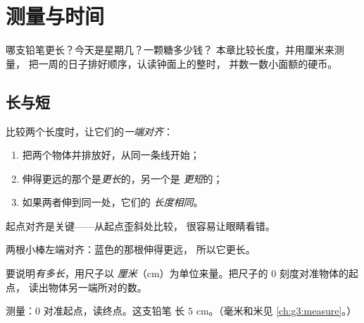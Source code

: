 \chapter{测量与时间}\label{ch:g1:measure}

哪支铅笔更长？今天是星期几？一颗糖多少钱？
本章比较长度，并用厘米来测量，
把一周的日子排好顺序，认读钟面上的整时，
并数一数小面额的硬币。

\section{长与短}

\begin{method}[比较长度]\label{met:g1:measure:compare}
比较两个长度时，让它们的\emph{一端对齐}：
\begin{enumerate}
  \item 把两个物体并排放好，从同一条线开始；
  \item 伸得更远的那个是\emph{更长}的，另一个是
        \emph{更短}的；
  \item 如果两者伸到同一处，它们的\emph{
        长度相同}。
\end{enumerate}
起点对齐是关键——从起点歪斜处比较，
很容易让眼睛看错。
\end{method}

\begin{omfigure}

{\small 两根小棒左端对齐：蓝色的那根伸得更远，
所以它更长。}
\end{omfigure}

\begin{definition}[厘米]\label{def:g1:measure:cm}
要说明\emph{有多长}，用尺子以
\emph{厘米}（cm）为单位来量。把尺子的 $0$ 刻度对准物体的起点，
读出物体另一端所对的数。
\end{definition}

\begin{omfigure}

{\small 测量：$0$ 对准起点，读终点。这支铅笔
长 $5$ cm。（毫米和米见
\cref{ch:g3:measure}。）}
\end{omfigure}

